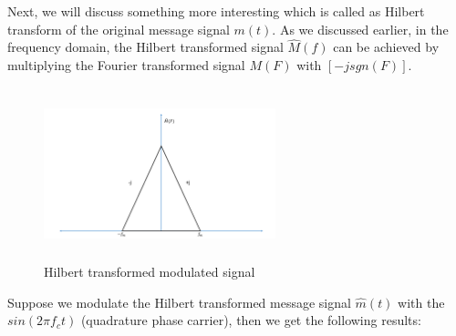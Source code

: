 Next, we will discuss something more interesting which is called as Hilbert transform of the original message signal $m(t)$. As we discussed earlier, in the frequency domain, the Hilbert transformed signal $\hat{M}(f)$ can be achieved by multiplying the Fourier transformed signal $M(F)$ with $[-j sgn(F)]$.
\begin{figure}[h]
	\centering
	\includegraphics[width=0.6\textwidth, height=5cm]{./sdf/simplified_coherent_receiver/figures/SSB3.pdf}
	\caption{Hilbert transformed modulated signal}\label{Hilbert_Transformed_signal}
\end{figure}
Suppose we modulate the Hilbert transformed message signal $\hat{m}(t)$  with the $sin(2\pi f_c t)$ (quadrature phase carrier), then we get the following results:

